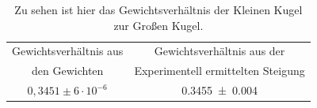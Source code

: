 \begin{table}[h]
	\caption{Zu sehen ist hier das Gewichtsverhältnis der Kleinen Kugel zur Großen Kugel. }
	\begin{tabular}{|c|c|}
		\hline
		Gewichtsverhältnis aus  & Gewichtsverhältnis aus der\\
		 den Gewichten &  Experimentell ermittelten Steigung\\
		\hline
		$0,3451 \pm 6 \cdot 10^{-6}$& \SI{0,3455+-0,004}{}\\
		\hline
	\end{tabular}
	\label{tab:Gewicht}
\end{table}
